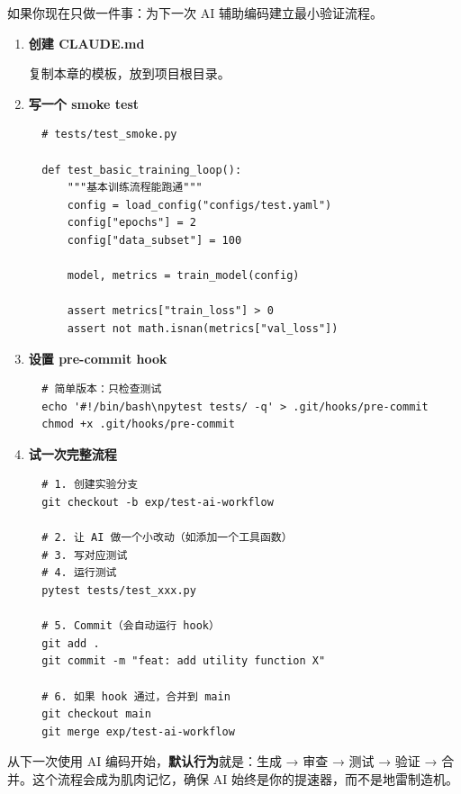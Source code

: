 如果你现在只做一件事：为下一次 AI 辅助编码建立最小验证流程。

\begin{enumerate}
  \item \textbf{创建 CLAUDE.md}

  复制本章的模板，放到项目根目录。

  \item \textbf{写一个 smoke test}
  \begin{verbatim}
  # tests/test_smoke.py

  def test_basic_training_loop():
      """基本训练流程能跑通"""
      config = load_config("configs/test.yaml")
      config["epochs"] = 2
      config["data_subset"] = 100

      model, metrics = train_model(config)

      assert metrics["train_loss"] > 0
      assert not math.isnan(metrics["val_loss"])
  \end{verbatim}

  \item \textbf{设置 pre-commit hook}
  \begin{verbatim}
  # 简单版本：只检查测试
  echo '#!/bin/bash\npytest tests/ -q' > .git/hooks/pre-commit
  chmod +x .git/hooks/pre-commit
  \end{verbatim}

  \item \textbf{试一次完整流程}
  \begin{verbatim}
  # 1. 创建实验分支
  git checkout -b exp/test-ai-workflow

  # 2. 让 AI 做一个小改动（如添加一个工具函数）
  # 3. 写对应测试
  # 4. 运行测试
  pytest tests/test_xxx.py

  # 5. Commit（会自动运行 hook）
  git add .
  git commit -m "feat: add utility function X"

  # 6. 如果 hook 通过，合并到 main
  git checkout main
  git merge exp/test-ai-workflow
  \end{verbatim}
\end{enumerate}

从下一次使用 AI 编码开始，\textbf{默认行为}就是：生成 → 审查 → 测试 → 验证 → 合并。这个流程会成为肌肉记忆，确保 AI 始终是你的提速器，而不是地雷制造机。
